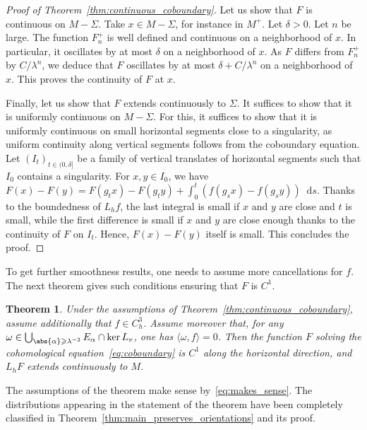 \documentclass[11pt, a4paper, oneside, final, pagebackref]{amsart}
\newcommand{\dd}{\mathop{}\!\mathrm{d}}
\renewcommand{\geq}{\geqslant}
\newtheorem{thm}{Theorem}[section]
\theoremstyle{definition}
\numberwithin{equation}{section}
\begin{document}
\begin{proof}[Proof of Theorem~\ref{thm:continuous_coboundary}]
Let us show that $F$ is continuous on $M-\Sigma$. Take $x \in M-\Sigma$, for
instance in $M^+$. Let $\delta>0$. Let $n$ be large. The function $F_n^+$ is
well defined and continuous on a neighborhood of $x$. In particular, it
oscillates by at most $\delta$ on a neighborhood of $x$. As $F$ differs from
$F_n^+$ by $C/\lambda^n$, we deduce that $F$ oscillates by at most
$\delta+C/\lambda^n$ on a neighborhood of $x$. This proves the continuity of
$F$ at $x$.

Finally, let us show that $F$ extends continuously to $\Sigma$. It suffices
to show that it is uniformly continuous on $M-\Sigma$. For this, it suffices
to show that it is uniformly continuous on small horizontal segments close to
a singularity, as uniform continuity along vertical segments follows from the
coboundary equation. Let $(I_t)_{t\in (0,\delta]}$ be a family of vertical
translates of horizontal segments such that $I_0$ contains a singularity. For
$x, y\in I_0$, we have $F(x) - F(y) = F(g_t x)-F(g_t y) + \int_0^t (f(g_s x)
- f(g_s y)) \dd s$. Thanks to the boundedness of $L_h f$, the last integral
is small if $x$ and $y$ are close and $t$ is small, while the first
difference is small if $x$ and $y$ are close enough thanks to the continuity
of $F$ on $I_t$. Hence, $F(x)-F(y)$ itself is small. This concludes the
proof.
\end{proof}

To get further smoothness results, one needs to assume more cancellations for
$f$. The next theorem gives such conditions ensuring that $F$ is $C^1$.
\begin{thm}
\label{thm:C1_coboundary} Under the assumptions of
Theorem~\ref{thm:continuous_coboundary}, assume additionally that $f \in
C^3_h$. Assume moreover that, for any $\omega \in \bigcup_{\abs{\alpha} \geq
\lambda^{-2}} E_\alpha \cap \ker L_v$, one has $\langle \omega, f \rangle =
0$. Then the function $F$ solving the cohomological
equation~\eqref{eq:coboundary} is $C^1$ along the horizontal direction, and
$L_h F$ extends continuously to $M$.
\end{thm}
The assumptions of the theorem make sense by~\eqref{eq:makes_sense}. The
distributions appearing in the statement of the theorem have been completely
classified in Theorem~\ref{thm:main_preserves_orientations} and its proof.
\end{document}
